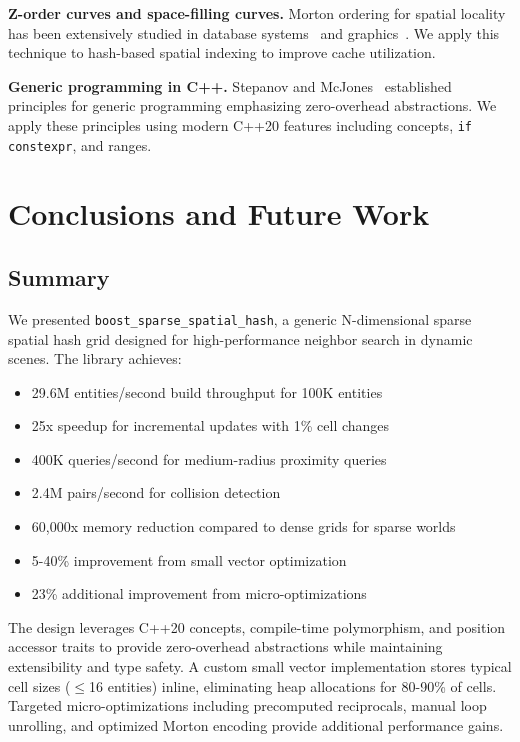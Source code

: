 \documentclass[11pt]{article}
\begin{document}
\textbf{Z-order curves and space-filling curves.} Morton ordering for spatial locality has been extensively studied in database systems~\cite{morton1966} and graphics~\cite{pharr2005}. We apply this technique to hash-based spatial indexing to improve cache utilization.

\textbf{Generic programming in C++.} Stepanov and McJones~\cite{stepanov2009} established principles for generic programming emphasizing zero-overhead abstractions. We apply these principles using modern C++20 features including concepts, \texttt{if constexpr}, and ranges.

\section{Conclusions and Future Work}

\subsection{Summary}

We presented \texttt{boost\_sparse\_spatial\_hash}, a generic N-dimensional sparse spatial hash grid designed for high-performance neighbor search in dynamic scenes. The library achieves:

\begin{itemize}
\item 29.6M entities/second build throughput for 100K entities
\item 25x speedup for incremental updates with 1\% cell changes
\item 400K queries/second for medium-radius proximity queries
\item 2.4M pairs/second for collision detection
\item 60,000x memory reduction compared to dense grids for sparse worlds
\item 5-40\% improvement from small vector optimization
\item 23\% additional improvement from micro-optimizations
\end{itemize}

The design leverages C++20 concepts, compile-time polymorphism, and position accessor traits to provide zero-overhead abstractions while maintaining extensibility and type safety. A custom small vector implementation stores typical cell sizes ($\leq$16 entities) inline, eliminating heap allocations for 80-90\% of cells. Targeted micro-optimizations including precomputed reciprocals, manual loop unrolling, and optimized Morton encoding provide additional performance gains.
\end{document}
